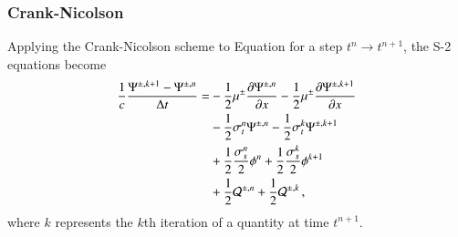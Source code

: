 \subsubsection{Crank-Nicolson}
Applying the Crank-Nicolson scheme to Equation  for a step
$t^n\rightarrow t^{n+1}$, the S-2 equations become
\begin{equation}\lequ{S2CN}\begin{split}
  \frac{1}{c}\frac{\Psi^{\pm,k+1}-\Psi^{\pm,n}}{\dt} = &
  -\half\mu^\pm\dydx{\Psi^{\pm,n}} -\half\mu^\pm\dydx{\Psi^{\pm,k+1}}\\
  &-\half\sigma_t^n\Psi^{\pm,n} -\half\sigma_t^k\Psi^{\pm,k+1}\\
  &+\half\frac{\sigma_s^n}{2}\phi^n +\half\frac{\sigma_s^k}{2}\phi^{k+1}\\
  &+\half\Q^{\pm,n} +\half\Q^{\pm,k} \pec
\end{split}\end{equation}
where $k$ represents the $k$th iteration of a quantity at time $t^{n+1}$.

